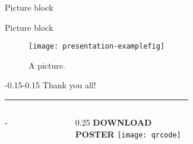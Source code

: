 \documentclass[english,xcolor=table,t]{beamer}
\begin{document}
\begin{frame}
\begin{columns}
\begin{vfillcolumn}{\colwidth}
\begin{block}{Picture block}
\end{block}

\vfill 
\begin{block}{Picture block}
\begin{figure}
	\centering
    \texttt{[image: presentation-examplefig]}
	\caption{A picture.}
\end{figure}

\end{block}

\vfill

\begin{minipage}{0.75\colwidth}

\begin{exampleblock}{}

\begin{adjustwidth}{-0.15\logoheight}{-0.15\logoheight}
\renewcommand{\blockhrule}{ \vskip -1.3cm \rule{\textwidth-2\padding + 0.3\logoheight}{1pt} \vskip -0.8cm}
\vskip 3cm
Thank you all!

\vskip 3cm

\blockhrule

\vskip 3cm



\vskip 3cm
\end{adjustwidth}
\end{exampleblock}

\end{minipage}

\begin{exampleblock}{}
\vskip -3cm
\end{exampleblock}

\end{vfillcolumn}
\end{columns}

\vskip -16cm
      \begin{columns}[T,totalwidth=\paperwidth]
        \begin{column}{\colwidth-\margin} \end{column} %
        
        \begin{column}{0.25\colwidth}
          \centering
          \Large \textbf{DOWNLOAD \\ POSTER} \vskip 2cm
          \texttt{[image: qrcode]}
        \end{column}
        \begin{column}{\margin} \end{column} %
      \end{columns}
\end{frame}
\end{document}
